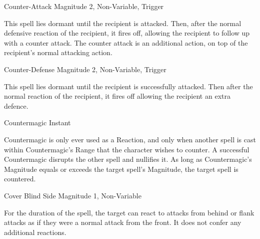 \begin{rpg-spell}
{Counter-Attack}
{Magnitude 2, Non-Variable, Trigger}

This spell lies dormant until the recipient is attacked. Then, after the normal defensive reaction of the recipient, it fires off, allowing the recipient to follow up with a counter attack. The counter attack is an additional action, on top of the recipient’s normal attacking action.
\end{rpg-spell}


\begin{rpg-spell}
{Counter-Defense}
{Magnitude 2, Non-Variable, Trigger}

This spell lies dormant until the recipient is successfully attacked. Then after the normal reaction of the recipient, it fires off allowing the recipient an extra defence.
\end{rpg-spell}



\begin{rpg-spell}
{Countermagic}
{Instant}

Countermagic is only ever used as a Reaction, and only when another spell is cast within Countermagic’s Range that the character wishes to counter. A successful Countermagic disrupts the other spell and nullifies it. As long as Countermagic’s Magnitude equals or exceeds the target spell’s Magnitude, the target spell is countered.
\end{rpg-spell}


\begin{rpg-spell}
{Cover Blind Side}
{Magnitude 1, Non-Variable}

For the duration of the spell, the target can react to attacks from behind or flank attacks as if they were a normal attack from the front. It does not confer any additional reactions.
\end{rpg-spell}


